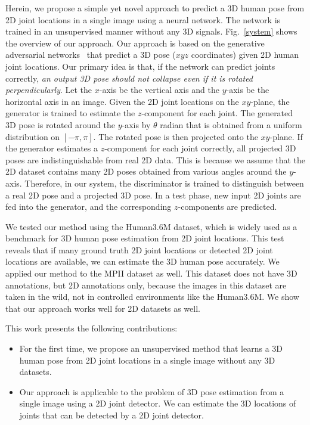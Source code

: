 \documentclass[runningheads]{llncs}
\newcommand{\matsui}[1]{\textbf{\textcolor{cyan}{[\textsc{MATSUI:} #1]}}}
\newcommand{\Fref}[1]{Fig.~\ref{#1}}
\begin{document}
Herein, we propose a simple yet novel approach to predict a 3D human pose from 2D joint locations in a single image using a neural network.
The network is trained in an unsupervised manner without any 3D signals. 
\Fref{system} shows the overview of our approach.
Our approach is based on the generative adversarial networks~\cite{goodfellow2014generative} that predict a 3D pose ($xyz$ coordinates) given 2D human joint locations.
Our primary idea is that, if the network can predict joints correctly,
\textit{an output 3D pose should not collapse even if it is rotated perpendicularly}.
Let the $x$-axis be the vertical axis and the $y$-axis be the horizontal axis in an image.
Given the 2D joint locations on the $xy$-plane, the generator is trained to estimate the $z$-component for each joint.
The generated 3D pose is rotated around the $y$-axis by $\theta$ radian that is obtained from a uniform distribution on $[-\pi, \pi]$.
The rotated pose is then projected onto the $xy$-plane.
If the generator estimates a $z$-component for each joint correctly, all projected 3D poses are indistinguishable from real 2D data.
This is because we assume that the 2D dataset contains many 2D poses obtained from various angles around the $y$-axis.
Therefore, in our system, the discriminator is trained to distinguish between a real 2D pose and a projected 3D pose.
In a test phase, new input 2D joints are fed into the generator, and the corresponding $z$-components are predicted.

We tested our method using the Human3.6M dataset, which is widely used as a benchmark for 3D human pose estimation from 2D joint locations.
This test reveals that if many ground truth 2D joint locations or detected 2D joint locations are available, we can estimate the 3D human pose accurately.
We applied our method to the MPII dataset as well.
This dataset does not have 3D annotations, but 2D annotations only, because the images in this dataset are taken in the wild, not in controlled environments like the Human3.6M.
We show that our approach works well for 2D datasets as well.

This work presents the following contributions:
\begin{itemize}
\item For the first time, we propose an unsupervised method that learns a 3D human pose from 2D joint locations in a single image without any 3D datasets.
\item Our approach is applicable to the problem of 3D pose estimation from a single image using a 2D joint detector. We can estimate the 3D locations of joints that can be detected by a 2D joint detector.
\end{itemize}
\end{document}
